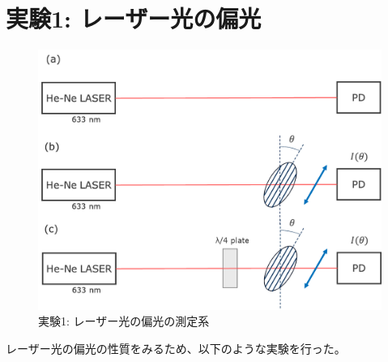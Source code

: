 \documentclass[9pt,dvipdfmx,a4paper]{jsarticle}
\begin{document}

\clearpage
\section{実験1: レーザー光の偏光}
\begin{figure}
    \centering
    \includegraphics[width=0.48\columnwidth]{fig_ex-1.png}
    \caption{実験1: レーザー光の偏光の測定系}
    \label{fig:ex-1}
\end{figure}
レーザー光の偏光の性質をみるため、以下のような実験を行った。
\end{document}
